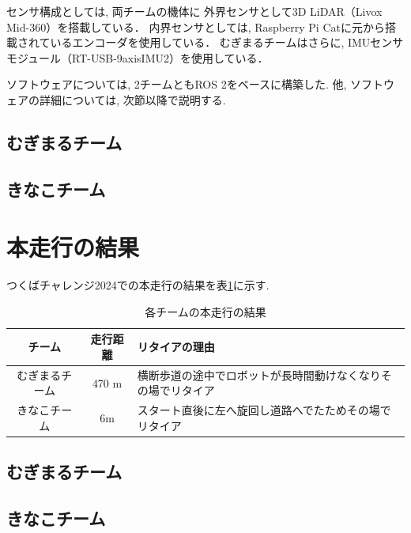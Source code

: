 \documentclass[twocolumn,9pt]{jsproceedings}
\begin{document}
センサ構成としては, 両チームの機体に
外界センサとして3D LiDAR（Livox Mid-360）を搭載している．
内界センサとしては, 
Raspberry Pi Catに元から搭載されているエンコーダを使用している．
むぎまるチームはさらに, IMUセンサモジュール（RT-USB-9axisIMU2\cite{RTshopIMU}）を使用している．

ソフトウェアについては, 
2チームともROS 2\cite{ROS 2}をベースに構築した. 
他, ソフトウェアの詳細については, 
次節以降で説明する. 


\subsection{むぎまるチーム}



\subsection{きなこチーム}\label{sub:localization}



\section{本走行の結果}

つくばチャレンジ2024での本走行の結果を表\ref{MainRun}に示す. 

\begin{table}[H]
  \caption{各チームの本走行の結果}
  \label{MainRun}
  \begin{tabular}{|c|c|p{4.0cm}|}
    \hline
    チーム         & 走行距離 & リタイアの理由\\
    \hline
    むぎまるチーム & 470 m    & 横断歩道の途中でロボットが長時間動けなくなりその場でリタイア\\
    \hline
    きなこチーム　 & 6m    & スタート直後に左へ旋回し道路へでたためその場でリタイア \\
    \hline
  \end{tabular}
\end{table}

\subsection{むぎまるチーム}


\subsection{きなこチーム}

\end{document}
